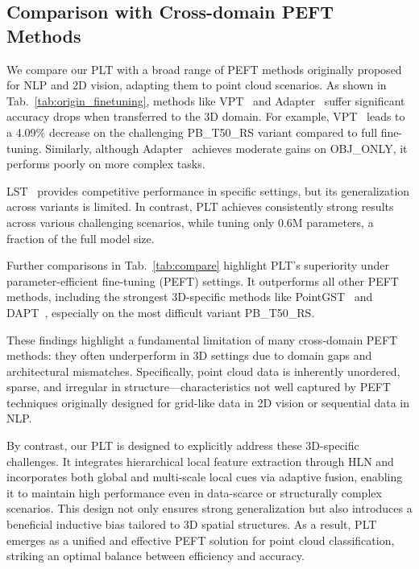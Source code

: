 \subsection{Comparison with Cross-domain PEFT Methods}
\label{sec:compare}

We compare our PLT with a broad range of PEFT methods originally proposed for NLP and 2D vision, adapting them to point cloud scenarios. As shown in Tab.~\ref{tab:origin_finetuning}, methods like VPT~\cite{jia2022visual} and Adapter~\cite{houlsby2019parameter} suffer significant accuracy drops when transferred to the 3D domain. For example, VPT~\cite{jia2022visual} leads to a 4.09\% decrease on the challenging PB\_T50\_RS variant compared to full fine-tuning. Similarly, although Adapter~\cite{houlsby2019parameter} achieves moderate gains on OBJ\_ONLY, it performs poorly on more complex tasks.

LST~\cite{sung2022lst} provides competitive performance in specific settings, but its generalization across variants is limited. In contrast, PLT achieves consistently strong results across various challenging scenarios, while tuning only 0.6M parameters, a fraction of the full model size.

Further comparisons in Tab.~\ref{tab:compare} highlight PLT's superiority under parameter-efficient fine-tuning (PEFT) settings. It outperforms all other PEFT methods, including the strongest 3D-specific methods like PointGST~\cite{liang2024parameter} and DAPT~\cite{zhou2024dynamic}, especially on the most difficult variant PB\_T50\_RS.

These findings highlight a fundamental limitation of many cross-domain PEFT methods: they often underperform in 3D settings due to domain gaps and architectural mismatches. Specifically, point cloud data is inherently unordered, sparse, and irregular in structure—characteristics not well captured by PEFT techniques originally designed for grid-like data in 2D vision or sequential data in NLP.

By contrast, our PLT is designed to explicitly address these 3D-specific challenges. It integrates hierarchical local feature extraction through HLN and incorporates both global and multi-scale local cues via adaptive fusion, enabling it to maintain high performance even in data-scarce or structurally complex scenarios. This design not only ensures strong generalization but also introduces a beneficial inductive bias tailored to 3D spatial structures. As a result, PLT emerges as a unified and effective PEFT solution for point cloud classification, striking an optimal balance between efficiency and accuracy.

